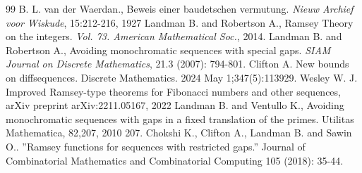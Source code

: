 \documentclass[10pt,a4paper]{amsart}
\begin{document}
\begin{thebibliography}{99}
 {\sc B. L. van der Waerdan.,}
Beweis einer baudetschen vermutung. {\em Nieuw Archief voor Wiskude}, 15:212-216, 1927
 {\sc Landman B.} and {\sc Robertson A.,} Ramsey Theory on the integers. {\em Vol. 73. American Mathematical Soc.}, 2014.
 {\sc Landman B.} and {\sc Robertson A.,} Avoiding monochromatic sequences with special gaps. {\em SIAM Journal on Discrete Mathematics}, 21.3 (2007): 794-801.
 {\sc Clifton A.} New bounds on diffsequences. Discrete Mathematics. 2024 May 1;347(5):113929.
 {\sc Wesley W. J.} Improved Ramsey-type theorems for Fibonacci numbers and other sequences,  arXiv preprint arXiv:2211.05167, 2022
 {\sc Landman B.} and {\sc Ventullo K.,}
Avoiding monochromatic sequences with gaps in a fixed translation of the primes. Utilitas Mathematica, 82,207, 2010 207.
 {\sc Chokshi K.,} {\sc Clifton A.,}  {\sc Landman B.} and  {\sc Sawin O.}. ''Ramsey functions for sequences with restricted gaps.'' Journal of Combinatorial Mathematics and Combinatorial Computing 105 (2018): 35-44.
\end{thebibliography}
\end{document}
